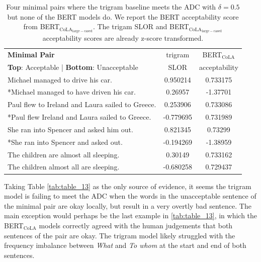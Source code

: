 \begin{table}[h]
    \centering
    \begin{tabular}{@{}lcc@{}}
    \toprule
    \textbf{Minimal Pair}                                    & trigram   & BERT$_\mathrm{CoLA}$\\
    \textbf{Top}: Acceptable | \textbf{Bottom}: Unacceptable & SLOR      & acceptability\\
    \toprule
    Michael managed to drive his car.  & 0.950214 & 0.733175 \\
    *Michael managed to have driven his car. & 0.26957 & -1.37701 \\
    \midrule
    Paul flew to Ireland and Laura sailed to Greece. & 0.253906 & 0.733086 \\
    *Paul flew Ireland and Laura sailed to Greece. &  -0.779695 & 0.731989 \\
    \midrule
     She ran into Spencer and asked him out. &  0.821345 & 0.73299 \\
    *She ran into Spencer and asked out.  & -0.194269 & -1.38959 \\
    \midrule
    The children are almost all sleeping.  & 0.30149 & 0.733162 \\
    The children almost all are sleeping. & -0.680258 & 0.729437 \\
    \bottomrule
    \end{tabular}
    \caption[Four minimal pairs where the trigram model meets ADC \newline with $\delta=0.5$ but not BERT$_\mathrm{CoLA}$]{Four minimal pairs where the trigram baseline meets the ADC with $\delta=0.5$ but none of the BERT models do. We report the BERT acceptability score from BERT$_\mathrm{CoLA_{large-cased}}$. The trigam SLOR and BERT$_\mathrm{CoLA_{large-cased}}$ acceptability scores are already z-score transformed. }
    \label{tab:table_14}
\end{table}

Taking Table \ref{tab:table_13} as the only source of evidence, it seems the trigram model is failing to meet the ADC when the words in the unacceptable sentence of the minimal pair are okay locally, but result in a very overtly bad sentence.  The main exception would perhaps be the last example in \ref{tab:table_13}, in which the BERT$_\mathrm{CoLA}$ models correctly agreed with the human judgements that both sentences of the pair are okay.  The trigram model likely struggled with the frequency imbalance between \textit{What} and \textit{To whom} at the start and end of both sentences.


